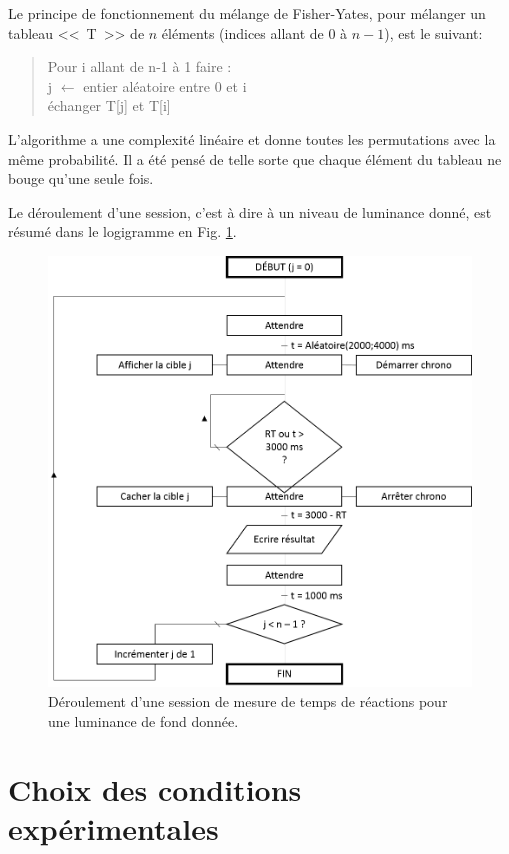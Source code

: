 	\par Le principe de fonctionnement du mélange de Fisher-Yates, pour mélanger un tableau <<~T~>> de $n$ éléments (indices allant de $0$ à $n-1$), est le suivant:
	\begin{quote}
	 Pour i allant de n-1 à 1 faire :\\
       j $\leftarrow$ entier aléatoire entre 0 et i\\
       échanger T[j] et T[i]
	\end{quote}
	L'algorithme a une complexité linéaire et donne toutes les permutations avec la même probabilité. Il a été pensé de telle sorte que chaque élément du tableau ne bouge qu'une seule fois.
	
	\par Le déroulement d'une session, c'est à dire à un niveau de luminance donné, est résumé dans le logigramme en Fig. \ref{fig:flowchart_expe}.
	
	\begin{figure}
		\centering
		\includegraphics[scale=0.8]{Figures/FlowchartExpeRVP}
		\caption{Déroulement d'une session de mesure de temps de réactions pour une luminance de fond donnée.}
		\label{fig:flowchart_expe}
	\end{figure}
	
	\section{Choix des conditions expérimentales}
